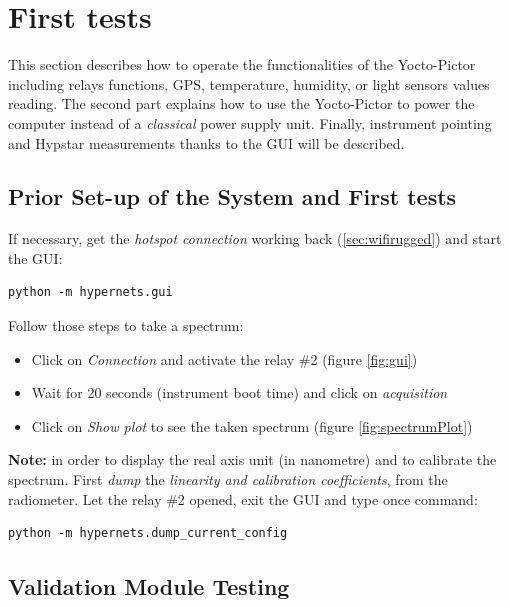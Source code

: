 \section{First tests}
\label{sec:firstTests}

\vspace{10pt}
This section describes how to operate the functionalities of the Yocto-Pictor 
including relays functions, GPS, temperature, humidity, or light sensors values
reading. The second part explains how to use the Yocto-Pictor to
power the computer instead of a \emph{classical} power supply unit.
Finally, instrument pointing and Hypstar measurements thanks to the GUI 
will be described.

\subsection{Prior Set-up of the System and First tests}


If necessary, get the \textit{hotspot connection} working back 
(\ref{sec:wifirugged}) and start the GUI: 

\begin{lstlisting}
python -m hypernets.gui
\end{lstlisting}
Follow those steps to take a spectrum:

\begin{itemize}
	\item Click on \textit{Connection} and activate the relay \#2 
		(figure \ref{fig:gui})
	\item Wait for 20 seconds (instrument boot time) and click on
		\textit{acquisition}
	\item Click on \textit{Show plot} to see the taken spectrum
		(figure \ref{fig:spectrumPlot})
\end{itemize}

\textbf{Note:} in order to display the real axis unit (in nanometre) 
and to calibrate the spectrum. First \textit{dump} the \textit{linearity and
calibration coefficients}, from the radiometer. Let the relay \#2 opened, exit
the GUI and type once command: 

\begin{lstlisting}
python -m hypernets.dump_current_config
\end{lstlisting}

\subsection{Validation Module Testing}

